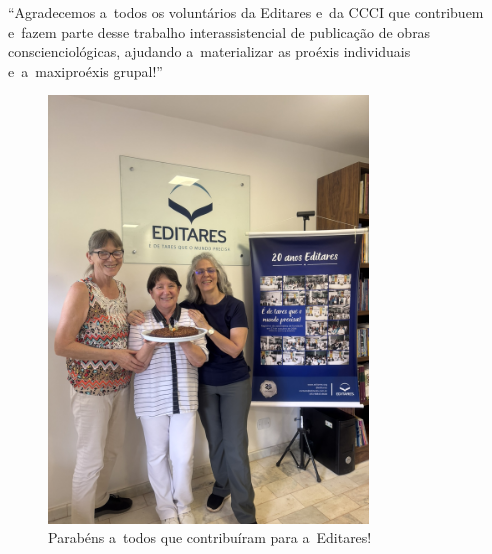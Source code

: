 \documentclass{gescons}
\begin{document}
\begin{multicols}{2}

\begin{pullquote}
``Agradecemos a~todos os voluntários da Editares e~da CCCI que contribuem e~fazem parte desse trabalho interassistencial de publicação de obras conscienciológicas, ajudando a~materializar as proéxis individuais e~a~maxiproéxis grupal!''
\end{pullquote}





        
    \end{multicols}

\begin{center}
    
    
\end{center}


\begin{figure}[h] %
\centering %
\includegraphics[width=8.5cm,trim={0 0 0 60},clip]{articles/resumo/fotos/gestao/IMG_1282.JPEG}
\caption*{Parabéns a~todos que contribuíram para a~Editares!} %
\end{figure}
\end{document}
